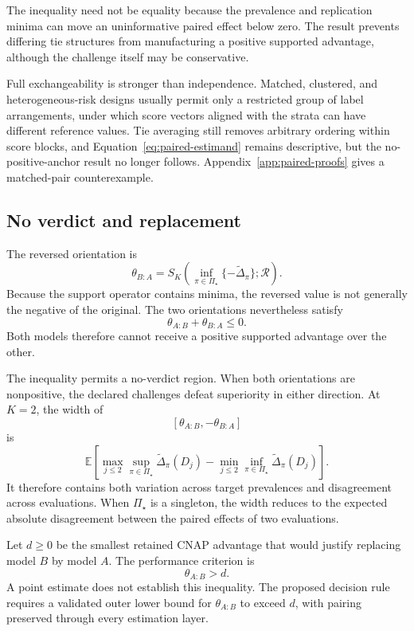 \documentclass[11pt]{article}
\newcommand{\Regime}{\mathcal{R}}
\newcommand{\PSet}{\Pi_\star}
\newcommand{\E}{\mathbb{E}}
\newcommand{\Dta}{\widetilde{\Delta}}
\theoremstyle{remark}
\begin{document}
The inequality need not be equality because the prevalence and replication minima can move an uninformative paired effect below zero. The result prevents differing tie structures from manufacturing a positive supported advantage, although the challenge itself may be conservative.

Full exchangeability is stronger than independence. Matched, clustered, and heterogeneous-risk designs usually permit only a restricted group of label arrangements, under which score vectors aligned with the strata can have different reference values. Tie averaging still removes arbitrary ordering within score blocks, and Equation~\eqref{eq:paired-estimand} remains descriptive, but the no-positive-anchor result no longer follows. Appendix~\ref{app:paired-proofs} gives a matched-pair counterexample.

\subsection{No verdict and replacement}

The reversed orientation is
\[
\theta_{B:A}
=
S_K\left(
\inf_{\pi\in\PSet}\{-\Dta_\pi\};
\Regime
\right).
\]
Because the support operator contains minima, the reversed value is not generally the negative of the original. The two orientations nevertheless satisfy
\begin{equation}
\theta_{A:B}+\theta_{B:A}\leq0.
\label{eq:orientation}
\end{equation}
Both models therefore cannot receive a positive supported advantage over the other.

The inequality permits a no-verdict region. When both orientations are nonpositive, the declared challenges defeat superiority in either direction. At $K=2$, the width of
\[
\left[\theta_{A:B},-\theta_{B:A}\right]
\]
is
\[
\E\!\left[
\max_{j\leq2}\sup_{\pi\in\PSet}\Dta_\pi(D_j)
-
\min_{j\leq2}\inf_{\pi\in\PSet}\Dta_\pi(D_j)
\right].
\]
It therefore contains both variation across target prevalences and disagreement across evaluations. When $\PSet$ is a singleton, the width reduces to the expected absolute disagreement between the paired effects of two evaluations.

Let $d\geq0$ be the smallest retained CNAP advantage that would justify replacing model $B$ by model $A$. The performance criterion is
\begin{equation}
\theta_{A:B}>d.
\label{eq:replacement}
\end{equation}
A point estimate does not establish this inequality. The proposed decision rule requires a validated outer lower bound for $\theta_{A:B}$ to exceed $d$, with pairing preserved through every estimation layer.
\end{document}
